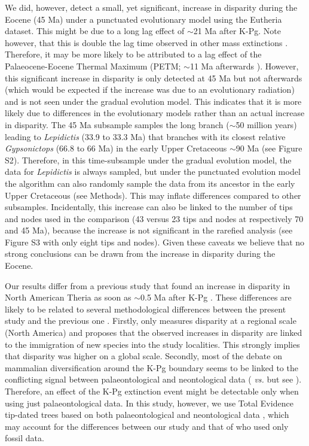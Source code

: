 \documentclass[10pt,letterpaper]{article}
\begin{document}
We did, however, detect a small, yet significant, increase in disparity during the Eocene (45 Ma) under a punctuated evolutionary model using the Eutheria dataset.
This might be due to a long lag effect of $\sim$21 Ma after K-Pg.
Note however, that this is double the lag time observed in other mass extinctions \cite{chen2012timing}.
Therefore, it may be more likely to be attributed to a lag effect of the Palaeocene-Eocene Thermal Maximum (PETM; $\sim$11 Ma afterwards \cite{bininda-emondsthe2007}).
However, this significant increase in disparity is only detected at 45 Ma but not afterwards (which would be expected if the increase was due to an evolutionary radiation) and is not seen under the gradual evolution model.
This indicates that it is more likely due to differences in the evolutionary models rather than an actual increase in disparity.
The 45 Ma subsample samples the long branch ($\sim$50 million years) leading to \textit{Lepidictis} (33.9 to 33.3 Ma) that branches with its closest relative \textit{Gypsonictops} (66.8 to 66 Ma) in the early Upper Cretaceous $\sim$90 Ma (see Figure S2).
Therefore, in this time-subsample under the gradual evolution model, the data for \textit{Lepidictis} is always sampled, but under the punctuated evolution model the algorithm can also randomly sample the data from its ancestor in the early Upper Cretaceous (see Methods).
This may inflate differences compared to other subsamples.
Incidentally, this increase can also be linked to the number of tips and nodes used in the comparison (43 versus 23 tips and nodes at respectively 70 and 45 Ma), because the increase is not significant in the rarefied analysis (see Figure S3 with only eight tips and nodes).
Given these caveats we believe that no strong conclusions can be drawn from the increase in disparity during the Eocene.

Our results differ from a previous study that found an increase in disparity in North American Theria as soon as $\sim$0.5 Ma after K-Pg \cite{Wilson2013}.
These differences are likely to be related to several methodological differences between the present study and the previous one \cite{Wilson2013}.
Firstly, \cite{Wilson2013} only measures disparity at a regional scale (North America) and proposes that the observed increases in disparity are linked to the immigration of new species into the study localities.
This strongly implies that disparity was higher on a global scale.
Secondly, most of the debate on mammalian diversification around the K-Pg boundary seems to be linked to the conflicting signal between palaeontological and neontological data (\cite{meredithimpacts2011} \textit{vs.} \cite{OLeary08022013} but see \cite{dosReis2014}).
Therefore, an effect of the K-Pg extinction event might be detectable only when using just palaeontological data.
In this study, however, we use Total Evidence tip-dated trees based on both palaeontological and neontological data \cite{Slater2012MEE,beckancient2014}, which may account for the differences between our study and that of \cite{Wilson2013} who used only fossil data.
\end{document}
